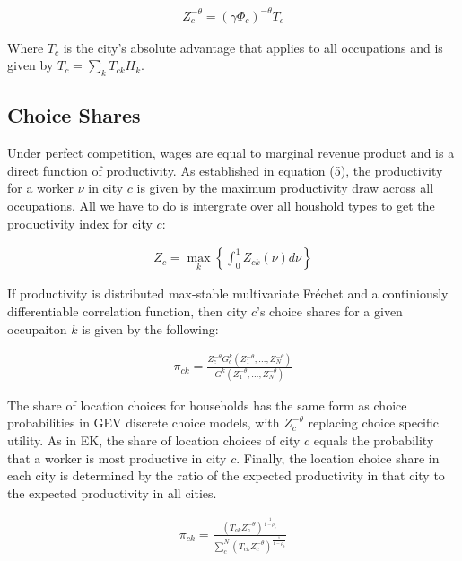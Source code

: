\documentclass[10pt]{article}
\begin{document}
\begin{align}
    Z_c^{-\theta} = (\gamma \Phi_c)^{-\theta} T_c
\end{align}

Where $T_c$ is the city's absolute advantage that applies to all occupations and is given by $T_c = \sum_{k}^{} T_{ck} H_k$.

\subsection{Choice Shares}

Under perfect competition, wages are equal to marginal revenue product and is a direct function of productivity. As established in equation (5), the productivity for a worker $\nu$ in city $c$ is given by the maximum productivity draw across all occupations. All we have to do is intergrate over all houshold types to get the productivity index for city $c$:

\begin{align}
    Z_c = \max_k \left\{ \int_{0}^{1} Z_{ck} (\nu) d\nu \right\}
\end{align}

If productivity is distributed max-stable multivariate Fréchet and a continiously differentiable correlation function, then city $c$'s choice shares for a given occupaiton $k$ is given by the following:

\begin{align}
    \pi_{ck} = \frac{Z_c^{-\theta} G_c^k(Z_1^{-\theta}, \dots, Z_N^{-\theta})}{G^k(Z_1^{-\theta}, \dots, Z_N^{-\theta})}
\end{align}

The share of location choices for households has the same form as choice probabilities in GEV discrete choice models, with $Z_c^{-\theta}$ replacing choice specific utility. As in EK, the share of location choices of city $c$ equals the probability that a worker is most productive in city $c$. Finally, the location choice share in each city is determined by the ratio of the expected productivity in that city to the expected productivity in all cities.

\begin{align}
    \pi_{ck} = \frac{(T_{ck} Z_c^{-\theta})^{\frac{1}{1 - \rho_k}}}{\sum_{c}^{N} (T_{ck} Z_c^{-\theta})^{\frac{1}{1 - \rho_k}}}
\end{align}

\end{document}
